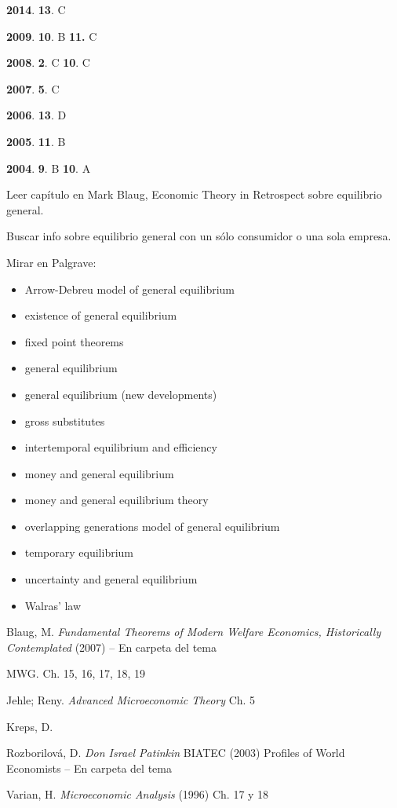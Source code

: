 \documentclass{nuevotema}
\begin{document}
\textbf{2014}. \textbf{13}. C

\textbf{2009}. \textbf{10}. B \textbf{11.} C

\textbf{2008}. \textbf{2}. C \textbf{10}. C

\textbf{2007}. \textbf{5}. C

\textbf{2006}. \textbf{13}. D

\textbf{2005}. \textbf{11}. B

\textbf{2004}. \textbf{9}. B \textbf{10}. A

Leer capítulo en Mark Blaug, Economic Theory in Retrospect sobre equilibrio general.

Buscar info sobre equilibrio general con un sólo consumidor o una sola empresa.

\bibliografia

Mirar en Palgrave:
\begin{itemize}
	\item Arrow-Debreu model of general equilibrium
	\item existence of general equilibrium
	\item fixed point theorems
	\item general equilibrium
	\item general equilibrium (new developments)
	\item gross substitutes
	\item intertemporal equilibrium and efficiency
	\item money and general equilibrium
	\item money and general equilibrium theory
	\item overlapping generations model of general equilibrium
	\item temporary equilibrium
	\item uncertainty and general equilibrium
	\item Walras' law
\end{itemize}

Blaug, M. \textit{Fundamental Theorems of Modern Welfare Economics, Historically Contemplated} (2007) -- En carpeta del tema

MWG. Ch. 15, 16, 17, 18, 19

Jehle; Reny. \textit{Advanced Microeconomic Theory} Ch. 5

Kreps, D. 

Rozborilová, D. \textit{Don Israel Patinkin} BIATEC (2003) Profiles of World Economists -- En carpeta del tema

Varian, H. \textit{Microeconomic Analysis} (1996) Ch. 17 y 18
\end{document}
